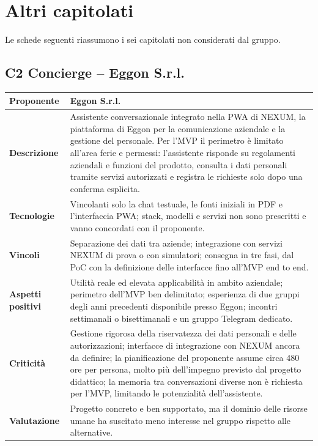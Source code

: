 \section{Altri capitolati}

Le schede seguenti riassumono i sei capitolati non considerati dal gruppo.

\subsection{C2 Concierge -- Eggon S.r.l.}

\begin{longtable}{|>{\raggedright\arraybackslash}p{3.2cm}|>{\raggedright\arraybackslash}p{\dimexpr\textwidth-3.2cm-4\tabcolsep-3\arrayrulewidth\relax}|}
    \hline
    \textbf{Proponente} & Eggon S.r.l. \\
    \hline
    \textbf{Descrizione} & Assistente conversazionale integrato nella PWA di NEXUM, la piattaforma di Eggon per la comunicazione aziendale e la gestione del personale. Per l'MVP il perimetro è limitato all'area ferie e permessi: l'assistente risponde su regolamenti aziendali e funzioni del prodotto, consulta i dati personali tramite servizi autorizzati e registra le richieste solo dopo una conferma esplicita. \\
    \hline
    \textbf{Tecnologie} & Vincolanti solo la chat testuale, le fonti iniziali in PDF e l'interfaccia PWA; stack, modelli e servizi non sono prescritti e vanno concordati con il proponente. \\
    \hline
    \textbf{Vincoli} & Separazione dei dati tra aziende; integrazione con servizi NEXUM di prova o con simulatori; consegna in tre fasi, dal PoC con la definizione delle interfacce fino all'MVP end to end. \\
    \hline
    \textbf{Aspetti positivi} & Utilità reale ed elevata applicabilità in ambito aziendale; perimetro dell'MVP ben delimitato; esperienza di due gruppi degli anni precedenti disponibile presso Eggon; incontri settimanali o bisettimanali e un gruppo Telegram dedicato. \\
    \hline
    \textbf{Criticità} & Gestione rigorosa della riservatezza dei dati personali e delle autorizzazioni; interfacce di integrazione con NEXUM ancora da definire; la pianificazione del proponente assume circa 480 ore per persona, molto più dell'impegno previsto dal progetto didattico; la memoria tra conversazioni diverse non è richiesta per l'MVP, limitando le potenzialità dell'assistente. \\
    \hline
    \textbf{Valutazione} & Progetto concreto e ben supportato, ma il dominio delle risorse umane ha suscitato meno interesse nel gruppo rispetto alle alternative. \\
    \hline
\end{longtable}

